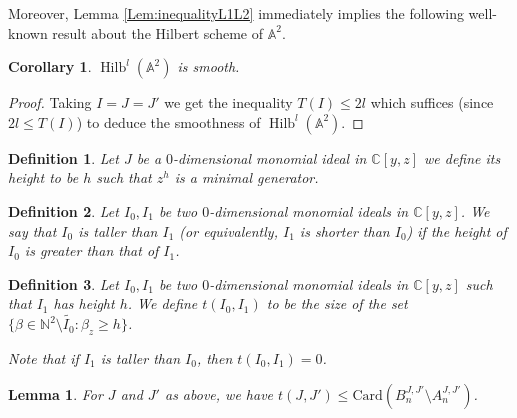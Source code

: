 \documentclass[10pt,a4paper]{amsart}
\newcommand{\BA}{{\mathbb{A}}}
\newcommand{\BC}{{\mathbb{C}}}
\DeclareMathOperator{\Hilb}{Hilb}
\newtheorem{lemma}{Lemma}
\newtheorem{corollary}{Corollary}
\newtheorem{definition}{Definition}
\begin{document}
Moreover, Lemma \ref{Lem:inequalityL1L2} immediately implies the following well-known result about the Hilbert scheme of $\BA^2$.
\begin{corollary}
     $\Hilb^l(\mathbb{A}^2)$ is smooth.
\end{corollary}
\begin{proof}
    Taking $I=J=J'$ we get the inequality $T(I)\leq 2l$ which suffices (since $2l \leq T(I)$) to deduce the smoothness of $\Hilb^l(\mathbb{A}^2)$.
\end{proof}
\begin{definition}
    Let $J$ be a $0$-dimensional monomial ideal in $\BC[y,z]$ we define its \emph{height} to be $h$ such that $z^h$ is a minimal generator.
\end{definition}
\begin{definition}
    Let $I_0,I_1$ be two $0$-dimensional monomial ideals in $\BC[y,z]$. We say that $I_0$ is \emph{taller than} $I_1$ (or equivalently, $I_1$ is \emph{shorter than} $I_0$) if the height of $I_0$ is greater than that of $I_1$.
\end{definition}

\begin{definition} Let $I_0,I_1$ be two $0$-dimensional  monomial ideals in $\BC[y,z]$ such that $I_1$ has height $h$. We define $t(I_0,I_1)$ to be the size of the set $\{\beta\in\mathbb{N}^2\setminus\tilde{I_0}:\beta_z\geq h\}$.

    Note that if $I_1$ is taller than $I_0$, then $t(I_0,I_1)=0$.
\end{definition}
 




\begin{lemma}\label{Cor:tLessGhost}
 For $J$ and $J'$ as above, we have $t(J,J') \leq \mathrm{Card}(B^{J,J'}_n\setminus A^{J,J'}_n)$.
\end{lemma}
\end{document}
